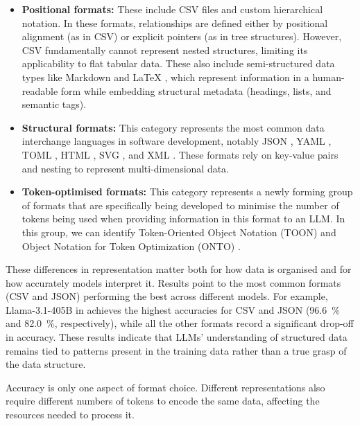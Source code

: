 \begin{itemize}
  \item \textbf{Positional formats:} These include CSV \cite{shafranovich2005common} files and custom
    hierarchical notation. In these formats, relationships are defined either by positional alignment (as in
    CSV) or explicit pointers (as in tree structures). However, CSV fundamentally cannot represent nested
    structures, limiting its applicability to flat tabular data. These also include semi-structured data
    types like Markdown \cite{macfarlane2024commonmark} and LaTeX \cite{lamport1994latex}, which represent
    information in a human-readable form while embedding structural metadata (headings, lists, and semantic tags).
  \item \textbf{Structural formats:} This category represents the most common data interchange languages in
    software development, notably JSON \cite{bray2017javascript}, YAML
    \cite{benkiki2009yaml}, TOML \cite{preston2021toml}, HTML \cite{whatwghtml}, SVG \cite{ferajoli2011svg},
    and XML \cite{bray1998xml}. These formats rely on key-value pairs and nesting to represent multi-dimensional data.
  \item \textbf{Token-optimised formats:} This category represents a newly forming group of formats that are
    specifically being developed to minimise the number of tokens being used when providing information in
    this format to an LLM. In this group, we can identify Token-Oriented Object Notation (TOON)
    \cite{toon-format-2025} and Object Notation for Token Optimization (ONTO) \cite{onto-serialization-format}.
\end{itemize}

These differences in representation matter both for how data is organised and for how accurately models
interpret it. Results point to the most common formats (CSV and JSON) performing the best across different
models. For example, Llama-3.1-405B in \cite{struct-text-eval} achieves the highest accuracies for CSV and
JSON (\qty{96.6}{\percent} and \qty{82.0}{\percent}, respectively), while all the other formats record a
significant drop-off in accuracy. These results indicate that LLMs' understanding of structured data
remains tied to patterns present in the training data rather than a true grasp of the data structure.

Accuracy is only one aspect of format choice. Different representations also require different numbers of
tokens to encode the same data, affecting the resources needed to process it.

